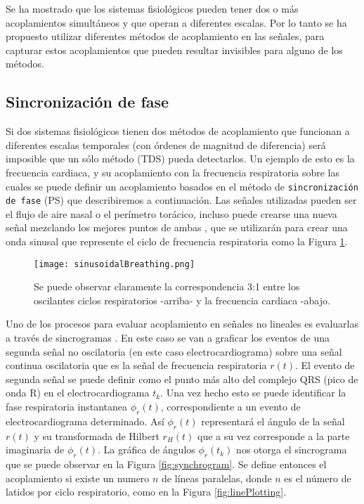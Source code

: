 \documentclass[twoside,twocolumn]{article}
\begin{document}
Se ha mostrado que los sistemas fisiológicos pueden tener dos o más acoplamientos simultáneos y que operan a diferentes escalas.
Por lo tanto se ha propuesto utilizar diferentes métodos de acoplamiento en las señales, para capturar estos acoplamientos que pueden resultar invisibles para alguno de los métodos.
\subsection{Sincronización de fase}
Si dos sistemas fisiológicos tienen dos métodos de acoplamiento que funcionan a diferentes escalas temporales (con órdenes de magnitud de diferencia) será imposible que un sólo método (TDS) pueda detectarlos.
Un ejemplo de esto es la frecuencia cardiaca, y su acoplamiento con la frecuencia respiratoria \cite{bartsch2014coexisting} sobre las cuales se puede definir un acoplamiento basados en el método de \texttt{sincronización de fase} (PS) que describiremos a continuación.
Las señales utilizadas pueden ser el flujo de aire nasal o el perímetro torácico, incluso puede crearse una nueva señal mezclando los mejores puntos de ambas \cite{bartsch2014coexisting}, que se utilizarán para crear una onda sinusal que represente el ciclo de frecuencia respiratoria como la Figura \ref{fig:sinusoidalBreathing}.
\begin{figure}[H]
\texttt{[image: sinusoidalBreathing.png]}
\caption{Se puede observar claramente la correspondencia 3:1 entre los oscilantes ciclos respiratorios -arriba- y la frecuencia cardiaca -abajo. }
\label{fig:sinusoidalBreathing}
\end{figure}
Uno de los procesos para evaluar acoplamiento en señales no lineales es evaluarlas a través de sincrogramas \cite{bartsch2014coexisting}.
En este caso se van a graficar los eventos de una segunda señal no oscilatoria (en este caso electrocardiograma) sobre una señal continua oscilatoria que es la señal de frecuencia respiratoria $r(t)$. El evento de segunda señal se puede definir como el punto más alto del complejo QRS (pico de onda R) en el electrocardiograma $t_k$.
Una vez hecho esto se puede identificar la fase respiratoria instantanea $\phi_r(t)$, correspondiente a un evento de electrocardiograma determinado. Así  $\phi_r(t)$ representará el ángulo de la señal $r(t)$ y su transformada de Hilbert $r_H(t)$ que a su vez corresponde a la parte imaginaria de $\phi_r(t)$.
La gráfica de ángulos $\phi_r(t_k)$ nos otorga el sincrograma que se puede observar en la Figura \ref{fig:synchrogram}. Se define entonces el acoplamiento si existe un numero $n$ de líneas paralelas, donde $n$ es el número de latidos por ciclo respiratorio, como en la Figura \ref{fig:linePlotting}.
\end{document}
